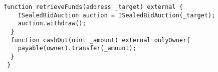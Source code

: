 \begin{lstlisting}[language=Solidity, firstnumber=19]
  function retrieveFunds(address _target) external {
	ISealedBidAuction auction = ISealedBidAuction(_target);
	auction.withdraw();
  }
  function cashOut(uint _amount) external onlyOwner{
    payable(owner).transfer(_amount);
  }
 }
\end{lstlisting}